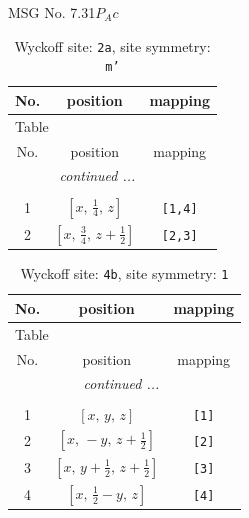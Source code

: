 \documentclass[fleqn,8pt]{jsarticle}
\begin{document}
\setcounter{MaxMatrixCols}{32}

\renewcommand{\tablename}{Table~}
\renewcommand{\figurename}{Figure~}
\begin{center}
\LARGE
MSG No. 7.31\quad$P_{A}c$
\end{center}
\renewcommand{\arraystretch}{1.2}
\begin{longtable}{ccc}
\caption{Wyckoff site: {\tt 2a}, site symmetry: {\tt m'}}
 \\
 \hline \hline
No. & position & mapping \\ \hline \endfirsthead

\multicolumn{2}{l}{\tablename\ \thetable{}} \\
 \hline \hline
No. & position & mapping \\ \hline \endhead

 \hline \hline
\multicolumn{2}{r}{\footnotesize\it continued ...} \\ \endfoot

 \hline \hline
\multicolumn{2}{r}{} \\ \endlastfoot

1 & $\left[ x,\, \frac{1}{4},\, z \right]$ & {\tt [1,4]} \\ \hline
2 & $\left[ x,\, \frac{3}{4},\, z + \frac{1}{2} \right]$ & {\tt [2,3]} \\
\end{longtable}
\renewcommand{\arraystretch}{1.2}
\begin{longtable}{ccc}
\caption{Wyckoff site: {\tt 4b}, site symmetry: {\tt 1}}
 \\
 \hline \hline
No. & position & mapping \\ \hline \endfirsthead

\multicolumn{2}{l}{\tablename\ \thetable{}} \\
 \hline \hline
No. & position & mapping \\ \hline \endhead

 \hline \hline
\multicolumn{2}{r}{\footnotesize\it continued ...} \\ \endfoot

 \hline \hline
\multicolumn{2}{r}{} \\ \endlastfoot

1 & $\left[ x,\, y,\, z \right]$ & {\tt [1]} \\ \hline
2 & $\left[ x,\, - y,\, z + \frac{1}{2} \right]$ & {\tt [2]} \\ \hline
3 & $\left[ x,\, y + \frac{1}{2},\, z + \frac{1}{2} \right]$ & {\tt [3]} \\ \hline
4 & $\left[ x,\, \frac{1}{2} - y,\, z \right]$ & {\tt [4]} \\
\end{longtable}
\end{document}
